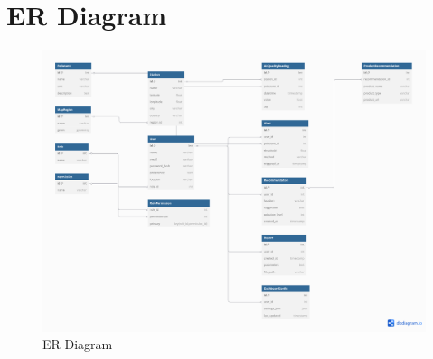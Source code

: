 \section{ER Diagram}

\begin{figure}[H]
  \centering
  \includegraphics[width=\linewidth]{Imagenes/ER_Diagram.png}
  \caption{ER Diagram}
\end{figure}

